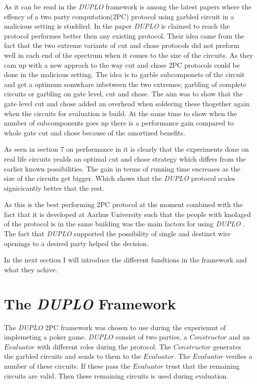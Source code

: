 \documentclass[twoside,11pt,openright]{report}
\newcommand{\DUPLO}{\textit{DUPLO} }
\begin{document}
As it can be read in  the \DUPLO framework is among the latest papers where the effency of a two party computation(2PC) protocol using garbled circuit in a malicious setting is studdied. In the paper \DUPLO is claimed to reach the protocol performes better then any existing protocol. Their idea came from the fact that the two extreme variants of cut and chose protocols did not preform well in each end of the spectrum when it comes to the size of the circuits. As they cam up with a new approch to the way cut and chose 2PC protocols could be done in the malicious setting. The idea is to garble subcomponets of the circuit and get a optimum somwhare inbetween the two extremes; garbling of complete circuits or garbling on gate level, cut and chose. The aim was to show that the gate level cut and chose added an overhead when soldering these thogether again when the circuits for evaluation is build. At the same time to show when the number of subcomponents goes up there is a performance gain compared to whole gate cut and chose because of the amortized benefits. 

As seen in section 7 on performance in  it is clearly that the experiments done on real life circuits yealds an optimal cut and chose strategy which differs from the earlier known possibilities. The gain in terms of running time encreases as the size of the circuits get bigger. Which shows that the \DUPLO protocol scales signicicantly better that the rest.

\bigskip

As this is the best performing 2PC protocol at the moment combined with the fact that it is developed at Aarhus University such that the people with knolaged of the protocol is in the same building was the main factors for using \DUPLO. The fact that \DUPLO supported the possibility of single and destinct wire openings to a desired party helped the decision. 

\bigskip

In the next section I will introduce the different fundtions in the framework and what they achive.

\section{The \DUPLO Framework}
\label{sec:duplo_framework}
The \DUPLO 2PC framework was chosen to use during the experiemnt of implemeting a poker game. \DUPLO consist of two parties, a $Constructor$ and an $Evaluator$ with different roles during the protocol. The $Constructor$ generates the garbled circuits and sends to them to the $Evaluator$. The $Evaluator$ verifies a number of these circuits. If these pass the $Evaluator$ trust that the remaining circuits are valid. Then these remaining circuits is used during evaluation.
\end{document}
